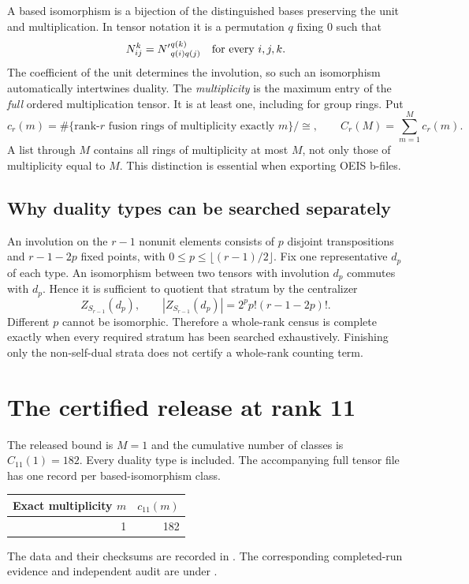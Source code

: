 \documentclass[11pt,a4paper]{article}
\theoremstyle{definition}\newtheorem{definition}[theorem]{Definition}\newtheorem{remark}[theorem]{Remark}
\newcommand{\Rank}{11}
\begin{document}
A based isomorphism is a bijection of the distinguished bases preserving the
unit and multiplication. In tensor notation it is a permutation $q$ fixing $0$
such that
\[
 N_{ij}^{k}={N'}_{q(i)q(j)}^{q(k)}\quad\hbox{for every }i,j,k.
\]
The coefficient of the unit determines the involution, so such an isomorphism
automatically intertwines duality. The \emph{multiplicity} is the maximum entry
of the \emph{full} ordered multiplication tensor. It is at least one, including
for group rings. Put
\[
 c_r(m)=\#\{\text{rank-}r\text{ fusion rings of multiplicity exactly }m\}/\cong,
 \qquad C_r(M)=\sum_{m=1}^{M}c_r(m).
\]
A list through $M$ contains all rings of multiplicity at most $M$, not only
those of multiplicity equal to $M$. This distinction is essential when exporting
OEIS b-files.

\subsection{Why duality types can be searched separately}
An involution on the $r-1$ nonunit elements consists of $p$ disjoint transpositions
and $r-1-2p$ fixed points, with $0\leq p\leq\lfloor(r-1)/2\rfloor$. Fix one
representative $d_p$ of each type. An isomorphism between two tensors with
involution $d_p$ commutes with $d_p$. Hence it is sufficient to quotient that
stratum by the centralizer
\[
 Z_{S_{r-1}}(d_p),\qquad |Z_{S_{r-1}}(d_p)|=2^p p!(r-1-2p)!.
\]
Different $p$ cannot be isomorphic. Therefore a whole-rank census is complete
exactly when every required stratum has been searched exhaustively. Finishing
only the non-self-dual strata does not certify a whole-rank counting term.
\section{The certified release at rank 11}
The released bound is $M=1$ and the cumulative number of classes is $C_{11}(1)=182$. Every duality type is included. The accompanying full tensor file has one record per based-isomorphism class.


\begin{center}\begin{tabular}{rr}\toprule Exact multiplicity $m$ & $c_{\Rank}(m)$\\\midrule
1 & 182\\
\bottomrule\end{tabular}\end{center}

The data and their checksums are recorded in . The corresponding completed-run evidence and independent audit are under .
\end{document}
